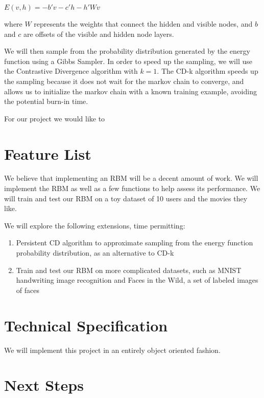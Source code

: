 \documentclass[12pt]{article}
\begin{document}
\begin{center}
$E(v,h) = -b'v - c'h -h'Wv $ 
\end{center}

where $W$ represents the weights that connect the hidden and visible nodes, and $b$ and $c$ are offsets of the visible and hidden node layers. 

We will then sample from the probability distribution generated by the energy function using a Gibbs Sampler. In order to speed up the sampling, we will use the Contrastive Divergence algorithm with $k=1$. The CD-k algorithm speeds up the sampling because it does not wait for the markov chain to converge, and allows us to initialize the markov chain with a known training example, avoiding the potential burn-in time. 

For our project we would like to 

\section{Feature List}

We believe that implementing an RBM will be a decent amount of work. We will implement the RBM as well as a few functions to help assess its performance. We will train and test our RBM on a toy dataset of 10 users and the movies they like. 

We will explore the following extensions, time permitting:
\begin{enumerate}
  \item Persistent CD algorithm to approximate sampling from the energy function probability distribution, as an alternative to CD-k
  \item Train and test our RBM on more complicated datasets, such as MNIST handwriting image recognition and Faces in the Wild, a set of labeled images of faces
\end{enumerate}

\section{Technical Specification}

We will implement this project in an entirely object oriented fashion. 


\section{Next Steps}
\end{document}
